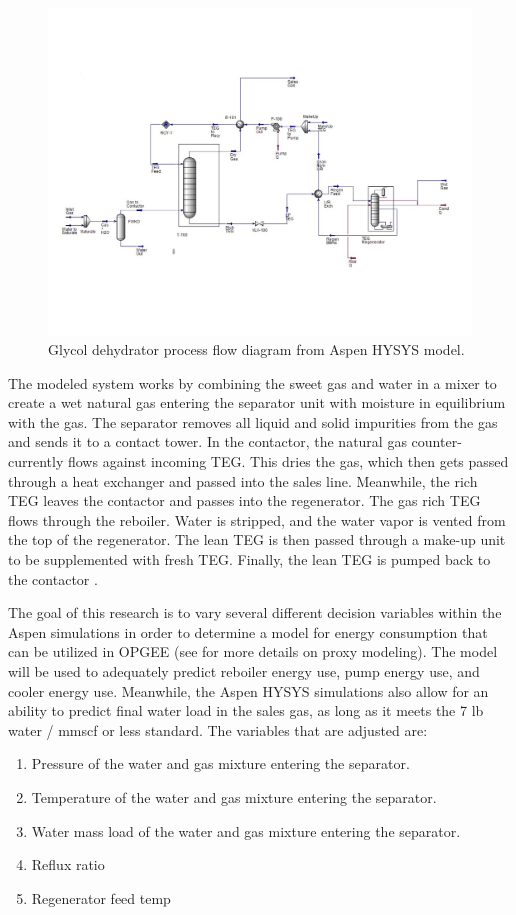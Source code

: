 \documentclass[11pt]{report}
\begin{document}
\begin{figure}[t]
\includegraphics[width=1.1\columnwidth]{images/DehydrationPFD.pdf}
\caption{Glycol dehydrator process flow diagram from Aspen HYSYS model.}
\label{fig:dehyPFDaspen}
\end{figure}

The modeled system works by combining the sweet gas and water in a mixer to create a wet natural gas entering the separator unit with moisture in equilibrium with the gas. The separator removes all liquid and solid impurities from the gas and sends it to a contact tower. In the contactor, the natural gas counter-currently flows against incoming TEG. This dries the gas, which then gets passed through a heat exchanger and passed into the sales line. Meanwhile, the rich TEG leaves the contactor and passes into the regenerator. The gas rich TEG flows through the reboiler. Water is stripped, and the water vapor is vented from the top of the regenerator. The lean TEG is then passed through a make-up unit to be supplemented with fresh TEG. Finally, the lean TEG is pumped back to the contactor \cite{Manning1991}. 

The goal of this research is to vary several different decision variables within the Aspen simulations in order to determine a model for energy consumption that can be utilized in OPGEE (see \cite{Masnadi2020} for more details on proxy modeling). The model will be used to adequately predict reboiler energy use, pump energy use, and cooler energy use. Meanwhile, the Aspen HYSYS simulations also allow for an ability to predict final water load in the sales gas, as long as it meets the 7 lb water / mmscf or less standard. The variables that are adjusted are:
\begin{enumerate}
\item Pressure of the water and gas mixture entering the separator. 
\item Temperature of the water and gas mixture entering the separator.
\item Water mass load of the water and gas mixture entering the separator.
\item Reflux ratio
\item Regenerator feed temp
\end{enumerate}
\end{document}
